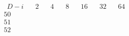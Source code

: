 \documentclass{article}
\begin{document}
{$$\begin{array}{|r|*{6}{r|}}
\hline
\ \ D-i \ \ &\ \ 2\ \ &\ \ 4\ \ &\ \ 8\ \ &\ \ 16\ \ &\ \ 32\ \ &\ \ 64\ \ \\
\hline
50 
 & 
 & 
 & 
 & 
 & 
 & 
\\
\hline
51 
 & 
 & 
 & 
 & 
 & 
 & 
\\
\hline
52 
 & 
 & 
 & 

\end{array}$$}
\end{document}
